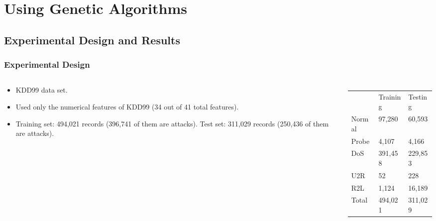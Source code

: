 \documentclass{beamer}
\begin{document}
\section[Using Genetic Algorithms]{Using Genetic Algorithms}
\subsection{Experimental Design and Results}
\begin{frame}
  \frametitle{Experimental Design}
  \begin{columns}

  \begin{column}{0.5\textwidth}
	\begin{itemize}
		\item KDD99 data set.
		\item Used only the numerical features of KDD99 (34 out of 41 total features).
		\item Training set: 494,021 records (396,741 of them are attacks). Test set: 311,029 records (250,436 of them are attacks).
	\end{itemize}
  \end{column}
  
  \begin{column}{0.5\textwidth}
  \begin{table}
\caption{ }
\begin{tabular}{lll}
  & Training & Testing \\
Normal & 97,280 & 60,593\\
Probe & 4,107 & 4,166\\
DoS         & 391,458 & 229,853\\
U2R & 52 & 228\\
R2L & 1,124 & 16,189\\
Total & 494,021 & 311,029\\
\end{tabular}
\end{table}
  \end{column}
  \end{columns}
\end{frame}
\end{document}
